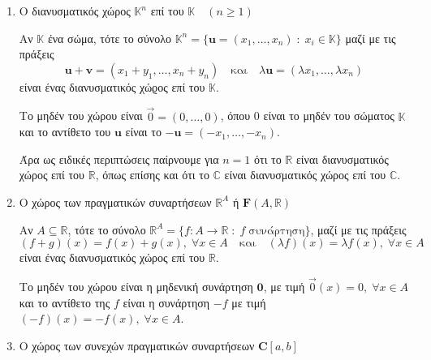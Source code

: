 \begin{examples}
\item {}
    \begin{enumerate}
        \item \label{ex:Rn}\textcolor{Col2}{Ο διανυσματικός χώρος $ \mathbb{K}^{n} $ 
            επί του $ \mathbb{K} \quad (n \geq 1) $}

            Αν $ \mathbb{K} $ ένα σώμα, τότε το σύνολο $ \mathbb{K}^{n} = 
            \{ \mathbf{u} = (x_{1},\ldots,x_{n}) \; : \; x_{i} \in \mathbb{K}\} $ 
            μαζί με τις πράξεις 
            \[
                \mathbf{u}+ \mathbf{v} = (x_{1}+ y_{1}, \ldots , x_{n}+y_{n}) 
                \quad \text{και} \quad \lambda \mathbf{u} = 
                ( \lambda x_{1}, \ldots, \lambda x_{n})
            \]
            είναι ένας διανυσματικός χώϱος επί του $ \mathbb{K} $. 

            Το μηδέν του χώρου 
            είναι $ \vec{0} = (0,\ldots,0) $, όπου 0 είναι το μηδέν του σώματος 
            $ \mathbb{K} $ και το αντίθετο του $ \mathbf{u} $ είναι το $ - \mathbf{u} =
            (- x_{1}, \ldots, - x_{n}) $.

            Άρα ως ειδικές περιπτώσεις παίρνουμε για $ n=1 $ ότι το $ \mathbb{R} $ 
            είναι διανυσματικός χώρος επί του $ \mathbb{R} $, όπως επίσης και ότι το 
            $ \mathbb{C} $ είναι διανυσματικός χώρος επί του $ \mathbb{C} $.

        \item\label{ex:funs} \textcolor{Col2}{Ο χώρος των πραγματικών συναρτήσεων 
            $\mathbb{R} ^{A}$ ή $\mathbf{F}(A, \mathbb{R})$}

            Αν $ A \subseteq \mathbb{R} $, τότε το σύνολο $ \mathbb{R}^{A} = 
            \{ f \colon A \to \mathbb{R} \; : \; f \; \text{συνάρτηση} \} $, μαζί με 
            τις πράξεις
            \[
                (f+g)(x) = f(x) +g(x), \; \forall x \in A \quad \text{και} 
                \quad (\lambda f)(x)= \lambda f(x), \; \forall x \in A
            \] 
            είναι ένας διανυσματικός χώρος επί του $ \mathbb{R} $.

            Το μηδέν του χώρου είναι η μηδενική συνάρτηση $ \mathbf{0} $, με τιμή 
            $ \vec{0}(x)=0, \; \forall x \in A $ και το αντίθετο της $f$ είναι 
            η συνάρτηση $ -f $ με τιμή $ (-f)(x) = - f(x), \; \forall x \in A $.

        \item \textcolor{Col2}{Ο χώρος των συνεχών πραγματικών συναρτήσεων 
            $ \mathbf{C}[a,b] $} 


\end{enumerate}
\end{examples}
